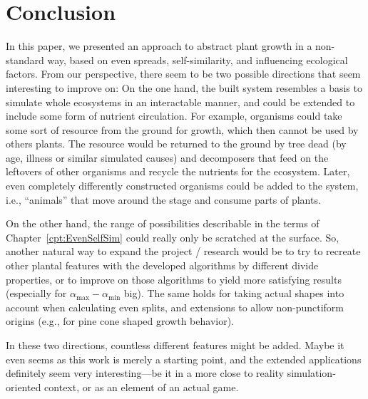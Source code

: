 \documentclass[11pt, abstract=on]{scrartcl}
\begin{document}
\section{Conclusion}
In this paper, we presented an approach to abstract plant growth in a non-standard way, based on even spreads, self-similarity, and influencing ecological factors. From our perspective, there seem to be two possible directions that seem interesting to improve on: On the one hand, the built system resembles a basis to simulate whole ecosystems in an interactable manner, and could be extended to include some form of nutrient circulation. For example, organisms could take some sort of resource from the ground for growth, which then cannot be used by others plants. The resource would be returned to the ground by tree dead (by age, illness or similar simulated causes) and decomposers that feed on the leftovers of other organisms and recycle the nutrients for the ecosystem. Later, even completely differently constructed organisms could be added to the system, i.e., ``animals'' that move around the stage and consume parts of plants.

On the other hand, the range of possibilities describable in the terms of Chapter~\ref{cpt:EvenSelfSim} could really only be scratched at the surface. So, another natural way to expand the project / research would be to try to recreate other plantal features with the developed algorithms by different divide properties, or to improve on those algorithms to yield more satisfying results (especially for $\alpha_\text{max} - \alpha_\text{min}$ big). The same holds for taking actual shapes into account when calculating even splits, and extensions to allow non-punctiform origins (e.g., for pine cone shaped growth behavior).

In these two directions, countless different features might be added. Maybe it even seems as this work is merely a starting point, and the extended applications definitely seem very interesting---be it in a more close to reality simulation-oriented context, or as an element of an actual game.
\end{document}

